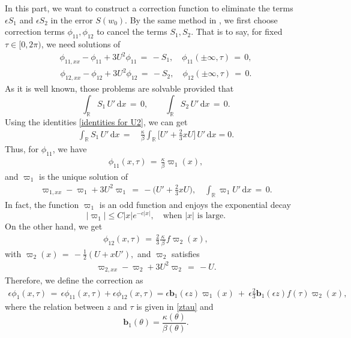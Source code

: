 \documentclass[10pt, reqno]{amsart}
\numberwithin{equation}{section}
\theoremstyle{definition}
\begin{document}
{{\subsubsection{}
In this part, we want to construct a correction function to eliminate the terms $\epsilon S_1$ and $\epsilon S_2$
in the error $S(w_0)$.
By the same method in \cite{delPKowWei1}, we first choose correction terms $\phi_{11}, {\phi_{12}}$ to cancel the terms
$ S_1, S_2. $
That is to say, for fixed $\tau\in [0, 2\pi)$,
we need solutions of
\begin{align*}
\phi_{11, xx} - \phi_{11} + 3 U^2 \phi_{11} \,=\, - S_1, \quad \phi_{11}(\pm \infty, \tau) \,=\, 0,
\end{align*}
\begin{align*}
\phi_{12, xx} - {\phi_{12}} + 3 U^2 {\phi_{12}} \,=\, - S_2, \quad{\phi_{12}}(\pm \infty, \tau) \,=\, 0.
\end{align*}
\medskip
As it is well known, those problems are solvable provided that
\begin{equation*}
 \int_{{\mathbb R}} S_1\, U' \,{\mathrm d}x \,=\, 0,
\qquad
 \int_{{\mathbb R}} S_2\, U' \,{\mathrm d}x \,=\, 0.
\end{equation*}
Using the identities \eqref{identities for U2},
we can get
\begin{align*}
 \int_{{\mathbb R}} S_1\, U' \,{\mathrm d}x
\,=\, & \frac{\kappa}{\beta}\int_{{\mathbb R}}\Big[ U' +\frac{2}{3}xU \Big] \, U' \,{\mathrm d}x=0.
\end{align*}
Thus, for $\phi_{11}$, we have
\begin{align*}
\phi_{11} (x, \tau) \,=\, \frac{ \kappa}{\beta}\varpi_1(x),
\end{align*}
and $\varpi_1$ is the unique solution of
\begin{align}\label{varphi1equation new}
\varpi_{1, xx} - \varpi_1 + 3 U^2 \varpi_1 \,=\, -\Big( U' + \frac 2 3 x U\Big), \quad \int_{{\mathbb R}} \varpi_1 U' \,{\mathrm d}x \,=\, 0.
\end{align}
In fact, the function $\varpi_1$ is an odd function and enjoys the exponential decay
\[ |\varpi_1 |\leq C |x| e^{-c|x|}, \quad \text{when $|x|$ is large}. \]
On the other hand, we get
\begin{align*}
{\phi_{12}} (x, \tau)
 \,=\, \frac{2}{3} \frac{ \kappa}{\, \beta\, } f \varpi_2(x),
\end{align*}
with
$\varpi_2 (x) \,=\, -\frac 12(U+ x U'), $
and $\varpi_2$ satisfies
\begin{align} \label{varphi2equation new}
\varpi_{2, xx} - \varpi_2 + 3 U^2 \varpi_2 \,=\, -U.
\end{align}
Therefore, we define the correction as
\begin{align}\label{definition of phi1}
 \epsilon\phi_1(x, \tau)
 \,=\, \epsilon{\phi_{11}}(x, \tau) + \epsilon{\phi_{12}}(x, \tau)
 = \epsilon{\mathbf b}_1(\epsilon z)\varpi_1(x)
\ +\
\epsilon\frac{2}{3} {\mathbf b}_1(\epsilon z)f(\tau) \varpi_2(x),
\end{align}
where the relation between $z$ and $\tau$ is given in \eqref{ztau}
and
\begin{equation}\label{definitionofb1}
{\mathbf b}_1(\theta)=\frac{\kappa(\theta)}{\beta(\theta)}.
\end{equation}

}}
\end{document}
